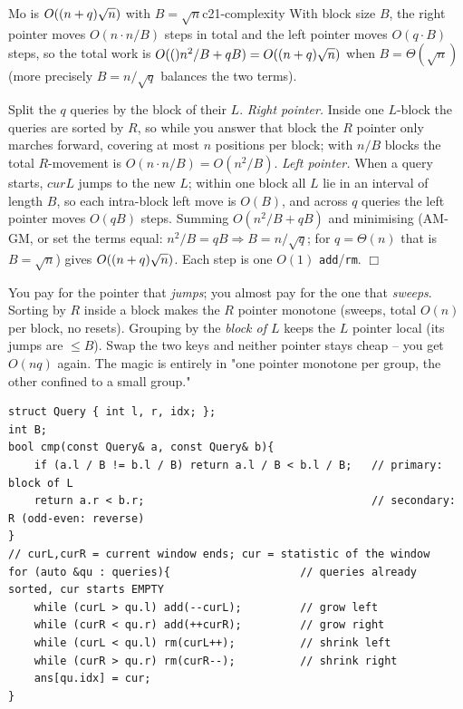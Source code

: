 \begin{theorem}{Mo is \(O((n+q)\sqrt n)\) with \(B=\sqrt n\)}{c21-complexity}
With block size \(B\), the right pointer moves \(O(n\cdot n/B)\) steps in total and
the left pointer moves \(O(q\cdot B)\) steps, so the total work is
\(O(()n^2/B + qB) = O((n+q)\sqrt n)\) when \(B=\Theta(\sqrt n)\) (more
precisely \(B=n/\sqrt q\) balances the two terms).
\end{theorem}
\begin{proofbox}
Split the \(q\) queries by the block of their \(L\). \emph{Right pointer.} Inside
one \(L\)-block the queries are sorted by \(R\), so while you answer that block the
\(R\) pointer only marches forward, covering at most \(n\) positions per block; with
\(n/B\) blocks the total \(R\)-movement is \(O(n\cdot n/B)=O(n^2/B)\). \emph{Left
pointer.} When a query starts, \(curL\) jumps to the new \(L\); within one block all
\(L\) lie in an interval of length \(B\), so each intra-block left move is \(O(B)\),
and across \(q\) queries the left pointer moves \(O(qB)\) steps. Summing
\(O(n^2/B+qB)\) and minimising (AM-GM, or set the terms equal: \(n^2/B=qB
\Rightarrow B=n/\sqrt q\); for \(q=\Theta(n)\) that is \(B=\sqrt n\)) gives
\(O((n+q)\sqrt n)\). Each step is one \(O(1)\) \texttt{add}/\texttt{rm}. \(\Box\)
\end{proofbox}

\begin{insightbox}
You pay for the pointer that \emph{jumps}; you almost pay for the one that
\emph{sweeps}.  Sorting by \(R\) inside a block makes the \(R\) pointer monotone
(sweeps, total \(O(n)\) per block, no resets).  Grouping by the \emph{block of
\(L\)} keeps the \(L\) pointer local (its jumps are \(\le B\)).  Swap the two keys
and neither pointer stays cheap -- you get \(O(nq)\) again.  The magic is entirely
in "one pointer monotone per group, the other confined to a small group."
\end{insightbox}

\begin{lstlisting}[caption={Generic Mo skeleton: block-sort the queries, sweep one window with O(1) add/rm, read off the statistic. ASCII only, identifiers without underscores}, label={lst:c21-mo}]
struct Query { int l, r, idx; };
int B;
bool cmp(const Query& a, const Query& b){
    if (a.l / B != b.l / B) return a.l / B < b.l / B;   // primary: block of L
    return a.r < b.r;                                   // secondary: R (odd-even: reverse)
}
// curL,curR = current window ends; cur = statistic of the window
for (auto &qu : queries){                    // queries already sorted, cur starts EMPTY
    while (curL > qu.l) add(--curL);         // grow left
    while (curR < qu.r) add(++curR);         // grow right
    while (curL < qu.l) rm(curL++);          // shrink left
    while (curR > qu.r) rm(curR--);          // shrink right
    ans[qu.idx] = cur;
}
\end{lstlisting}

